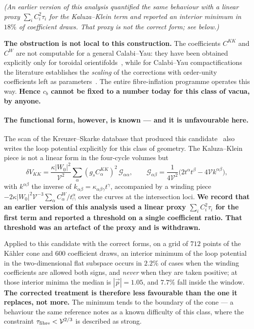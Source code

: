 \emph{(An earlier version of this analysis quantified the same behaviour with a linear proxy $\sum_iC_i^2\tau_i$ for the Kaluza--Klein term and reported an interior minimum in $18\%$ of coefficient draws. That proxy is not the correct form; see below.)}

\textbf{The obstruction is not local to this construction.} The coefficients $C^{KK}$ and $C^W$ are not computable for a general Calabi--Yau: they have been obtained explicitly only for toroidal orientifolds~\cite{BHP}, while for Calabi--Yau compactifications the literature establishes the \emph{scaling} of the corrections with order-unity coefficients left as parameters~\cite{CCQ}. The entire fibre-inflation programme operates this way. \textbf{Hence $c_b$ cannot be fixed to a number today for this class of vacua, by anyone.}

\paragraph{The functional form, however, is known --- and it is unfavourable here.} The scan of the Kreuzer--Skarke database that produced this candidate~\cite{Shukla} also writes the loop potential explicitly for this class of geometry. The Kaluza--Klein piece is not a linear form in the four-cycle volumes but
\begin{equation}
\delta V_{KK}=\frac{\kappa|W_0|^2}{\mathcal V^2}\sum_\alpha(g_sC^{KK}_\alpha)^2\,\mathcal G_{\alpha\alpha},
\qquad
\mathcal G_{\alpha\beta}=\frac{1}{4\mathcal V^2}\big(2t^\alpha t^\beta-4\mathcal V k^{\alpha\beta}\big),
\end{equation}
with $k^{\alpha\beta}$ the inverse of $k_{\alpha\beta}=\kappa_{\alpha\beta\gamma}t^\gamma$, accompanied by a winding piece $-2\kappa|W_0|^2\mathcal V^{-3}\sum_\alpha C^W_\alpha/t^\alpha_\cap$ over the curves at the intersection loci. \textbf{We record that an earlier version of this analysis used a linear proxy $\sum_iC_i^2\tau_i$ for the first term and reported a threshold on a single coefficient ratio. That threshold was an artefact of the proxy and is withdrawn.}

Applied to this candidate with the correct forms, on a grid of $712$ points of the K\"ahler cone and $600$ coefficient draws, an interior minimum of the loop potential in the two-dimensional flat subspace occurs in $2.2\%$ of cases when the winding coefficients are allowed both signs, and \emph{never} when they are taken positive; at those interior minima the median is $|\vec p|=1.05$, and $7.7\%$ fall inside the window. \textbf{The corrected treatment is therefore less favourable than the one it replaces, not more.} The minimum tends to the boundary of the cone --- a behaviour the same reference notes as a known difficulty of this class, where the constraint $\tau_{\rm fibre}<\mathcal V^{2/3}$ is described as strong.

